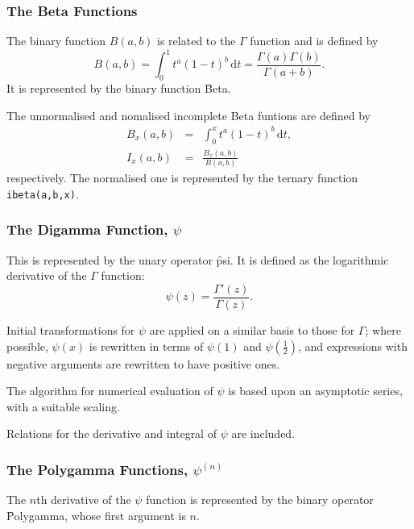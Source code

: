 \subsubsection{The Beta Functions}
\hypertarget{BETAF}{}
\hypertarget{operator:BETA}{}
\hypertarget{operator:IBETA}{}
The binary function $B(a,b)$ is related to the $\Gamma$
function\cite{AbramowitzStegun:72} and is defined by
$$ B(a,b) = \int_0^1 t^a (1-t)^b\, \mathrm{d}t =
\frac{\Gamma(a)\Gamma(b)}{\Gamma(a+b)}.$$
It is represented by the binary function \f{Beta}.

The unnormalised and nomalised incomplete Beta funtions are defined by
\begin{eqnarray*}
B_x(a,b) & = & \int_0^x t^a (1-t)^b\, \mathrm{d}t,\\
I_x(a,b) & = & \frac{B_x(a,b)}{B(a,b)}
\end{eqnarray*}
respectively. The normalised one is represented by the ternary function
\texttt{ibeta(a,b,x)}.

\subsubsection{The Digamma Function, $\psi$}
\hypertarget{DIGAM}{}

This is represented by the unary operator \f{psi}. It is defined as the
logarithmic derivative of the $\Gamma$  function:
$$ \psi(z) = \frac{\Gamma'(z)}{\Gamma(z)}. $$

Initial transformations for $\psi$ are applied on a similar basis to
those for $\Gamma$; where possible, $\psi(x)$ is rewritten in
terms of $\psi(1)$ and $\psi(\frac{1}{2})$, and expressions with negative
arguments are rewritten to have positive ones.

The algorithm for numerical evaluation of $\psi$ is based upon an
asymptotic series, with a suitable scaling.

Relations for the derivative and integral of $\psi$ are included.

\subsubsection{The Polygamma Functions, $\psi^{(n)}$}
\hypertarget{POLYGAM}{}

The $n$th derivative of the $\psi$ function is represented by the
binary operator \f{Polygamma}, whose first argument is $n$.

